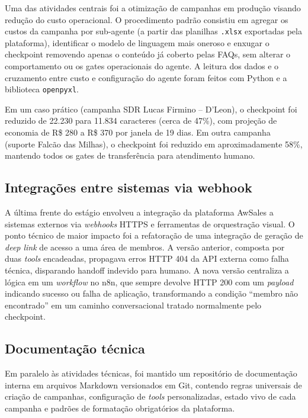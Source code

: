\documentclass[12pt,a4paper,oneside]{article}
\begin{document}
Uma das atividades centrais foi a otimização de campanhas em produção visando redução do custo operacional. O procedimento padrão consistiu em agregar os custos da campanha por sub-agente (a partir das planilhas \texttt{.xlsx} exportadas pela plataforma), identificar o modelo de linguagem mais oneroso e enxugar o checkpoint removendo apenas o conteúdo já coberto pelas FAQs, sem alterar o comportamento ou os gates operacionais do agente. A leitura dos dados e o cruzamento entre custo e configuração do agente foram feitos com Python e a biblioteca \texttt{openpyxl}.

Em um caso prático (campanha SDR Lucas Firmino -- D'Leon), o checkpoint foi reduzido de 22.230 para 11.834 caracteres (cerca de 47\%), com projeção de economia de R\$ 280 a R\$ 370 por janela de 19 dias. Em outra campanha (suporte Falcão das Milhas), o checkpoint foi reduzido em aproximadamente 58\%, mantendo todos os gates de transferência para atendimento humano.

\subsection{Integrações entre sistemas via webhook}

A última frente do estágio envolveu a integração da plataforma AwSales a sistemas externos via \textit{webhooks} HTTPS e ferramentas de orquestração visual. O ponto técnico de maior impacto foi a refatoração de uma integração de geração de \textit{deep link} de acesso a uma área de membros. A versão anterior, composta por duas \textit{tools} encadeadas, propagava erros HTTP 404 da API externa como falha técnica, disparando handoff indevido para humano. A nova versão centraliza a lógica em um \textit{workflow} no n8n, que sempre devolve HTTP 200 com um \textit{payload} indicando sucesso ou falha de aplicação, transformando a condição ``membro não encontrado'' em um caminho conversacional tratado normalmente pelo checkpoint.

\subsection{Documentação técnica}

Em paralelo às atividades técnicas, foi mantido um repositório de documentação interna em arquivos Markdown versionados em Git, contendo regras universais de criação de campanhas, configuração de \textit{tools} personalizadas, estado vivo de cada campanha e padrões de formatação obrigatórios da plataforma.
\end{document}
